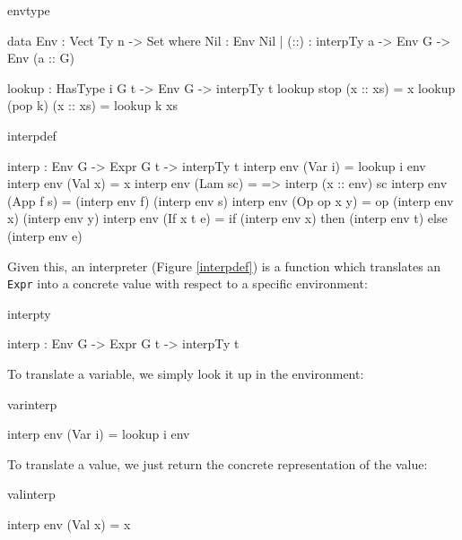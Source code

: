 \begin{SaveVerbatim}{envtype}

data Env : Vect Ty n -> Set where
    Nil  : Env Nil
  | (::) : interpTy a -> Env G -> Env (a :: G)

lookup : HasType i G t -> Env G -> interpTy t
lookup stop    (x :: xs) = x
lookup (pop k) (x :: xs) = lookup k xs

\end{SaveVerbatim}

\begin{SaveVerbatim}{interpdef}

interp : Env G -> Expr G t -> interpTy t
interp env (Var i)     = lookup i env
interp env (Val x)     = x
interp env (Lam sc)    = \x => interp (x :: env) sc
interp env (App f s)   = (interp env f) (interp env s)
interp env (Op op x y) = op (interp env x) (interp env y)
interp env (If x t e)  = if (interp env x) then (interp env t) 
                                           else (interp env e)

\end{SaveVerbatim}

\noindent
Given this, an interpreter (Figure \ref{interpdef})
is a function which translates an \texttt{Expr} into a
concrete \Idris{} value with respect to a specific environment:

\begin{SaveVerbatim}{interpty}

interp : Env G -> Expr G t -> interpTy t

\end{SaveVerbatim}

\noindent
To translate a variable, we simply look it up in the environment:

\begin{SaveVerbatim}{varinterp}

interp env (Var i) = lookup i env

\end{SaveVerbatim}

\noindent
To translate a value, we just return the concrete representation of the value:

\begin{SaveVerbatim}{valinterp}

interp env (Val x) = x

\end{SaveVerbatim}


